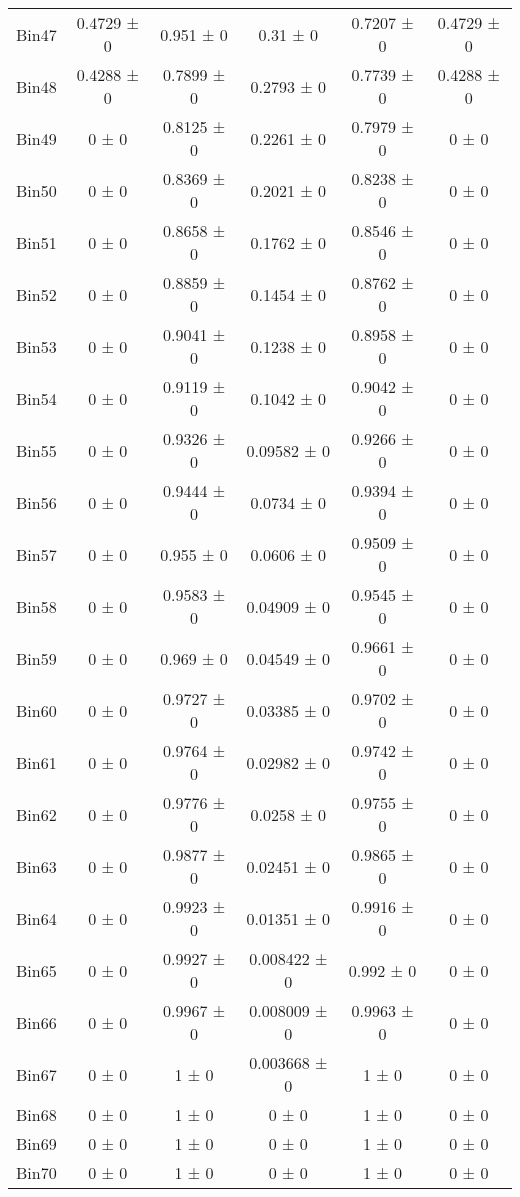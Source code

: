 \begin{tabular}{@{\extracolsep{4pt}}lccccc@{}}
     Bin47 & 0.4729 ± 0 & 0.951 ± 0 & 0.31 ± 0 & 0.7207 ± 0 & 0.4729 ± 0 \\ 
     Bin48 & 0.4288 ± 0 & 0.7899 ± 0 & 0.2793 ± 0 & 0.7739 ± 0 & 0.4288 ± 0 \\ 
     Bin49 & 0 ± 0 & 0.8125 ± 0 & 0.2261 ± 0 & 0.7979 ± 0 & 0 ± 0 \\ 
     Bin50 & 0 ± 0 & 0.8369 ± 0 & 0.2021 ± 0 & 0.8238 ± 0 & 0 ± 0 \\ 
     Bin51 & 0 ± 0 & 0.8658 ± 0 & 0.1762 ± 0 & 0.8546 ± 0 & 0 ± 0 \\ 
     Bin52 & 0 ± 0 & 0.8859 ± 0 & 0.1454 ± 0 & 0.8762 ± 0 & 0 ± 0 \\ 
     Bin53 & 0 ± 0 & 0.9041 ± 0 & 0.1238 ± 0 & 0.8958 ± 0 & 0 ± 0 \\ 
     Bin54 & 0 ± 0 & 0.9119 ± 0 & 0.1042 ± 0 & 0.9042 ± 0 & 0 ± 0 \\ 
     Bin55 & 0 ± 0 & 0.9326 ± 0 & 0.09582 ± 0 & 0.9266 ± 0 & 0 ± 0 \\ 
     Bin56 & 0 ± 0 & 0.9444 ± 0 & 0.0734 ± 0 & 0.9394 ± 0 & 0 ± 0 \\ 
     Bin57 & 0 ± 0 & 0.955 ± 0 & 0.0606 ± 0 & 0.9509 ± 0 & 0 ± 0 \\ 
     Bin58 & 0 ± 0 & 0.9583 ± 0 & 0.04909 ± 0 & 0.9545 ± 0 & 0 ± 0 \\ 
     Bin59 & 0 ± 0 & 0.969 ± 0 & 0.04549 ± 0 & 0.9661 ± 0 & 0 ± 0 \\ 
     Bin60 & 0 ± 0 & 0.9727 ± 0 & 0.03385 ± 0 & 0.9702 ± 0 & 0 ± 0 \\ 
     Bin61 & 0 ± 0 & 0.9764 ± 0 & 0.02982 ± 0 & 0.9742 ± 0 & 0 ± 0 \\ 
     Bin62 & 0 ± 0 & 0.9776 ± 0 & 0.0258 ± 0 & 0.9755 ± 0 & 0 ± 0 \\ 
     Bin63 & 0 ± 0 & 0.9877 ± 0 & 0.02451 ± 0 & 0.9865 ± 0 & 0 ± 0 \\ 
     Bin64 & 0 ± 0 & 0.9923 ± 0 & 0.01351 ± 0 & 0.9916 ± 0 & 0 ± 0 \\ 
     Bin65 & 0 ± 0 & 0.9927 ± 0 & 0.008422 ± 0 & 0.992 ± 0 & 0 ± 0 \\ 
     Bin66 & 0 ± 0 & 0.9967 ± 0 & 0.008009 ± 0 & 0.9963 ± 0 & 0 ± 0 \\ 
     Bin67 & 0 ± 0 & 1 ± 0 & 0.003668 ± 0 & 1 ± 0 & 0 ± 0 \\ 
     Bin68 & 0 ± 0 & 1 ± 0 & 0 ± 0 & 1 ± 0 & 0 ± 0 \\ 
     Bin69 & 0 ± 0 & 1 ± 0 & 0 ± 0 & 1 ± 0 & 0 ± 0 \\ 
     Bin70 & 0 ± 0 & 1 ± 0 & 0 ± 0 & 1 ± 0 & 0 ± 0 \\ 

\end{tabular}
